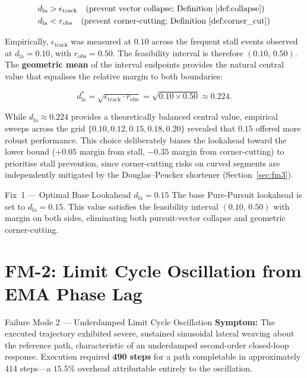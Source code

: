 \documentclass[12pt, a4paper, oneside]{report}
\theoremstyle{definition}
\newcommand{\dlookahead}{d_{\mathrm{la}}}
\begin{document}
\begin{align}
  \dlookahead &> \epsilon_{\mathrm{track}}
    \quad\text{(prevent vector collapse; Definition~\ref{def:collapse})}
    \label{eq:lower} \\
  \dlookahead &< r_{\mathrm{obs}}
    \quad\text{(prevent corner-cutting; Definition~\ref{def:corner_cut})}
    \label{eq:upper}
\end{align}

Empirically, $\epsilon_{\mathrm{track}}$ was measured at $0.10$
across the frequent stall events observed at $\dlookahead = 0.10$, with
$r_{\mathrm{obs}} = 0.50$. The feasibility interval is therefore
$(0.10,\, 0.50)$. The \textbf{geometric mean} of the interval
endpoints provides the natural central value that equalises the
relative margin to both boundaries:

\begin{equation}
  \dlookahead^* = \sqrt{\epsilon_{\mathrm{track}} \cdot r_{\mathrm{obs}}}
               = \sqrt{0.10 \times 0.50}
               \approx 0.224.
  \label{eq:opt_la}
\end{equation}

While $\dlookahead \approx 0.224$ provides a theoretically balanced central value, empirical sweeps across the grid $\{0.10, 0.12, 0.15, 0.18, 0.20\}$ revealed that $0.15$ offered more robust performance. This choice deliberately biases the lookahead toward the lower bound ($+0.05$ margin from stall, $-0.35$ margin from corner-cutting) to prioritise stall prevention, since corner-cutting risks on curved segments are independently mitigated by the Douglas--Peucker shortener (Section~\ref{sec:fm3}).

\begin{fixbox}{Fix~1 --- Optimal Base Lookahead
               $\dlookahead = 0.15$}
The base Pure-Pursuit lookahead is set to $\dlookahead = 0.15$.
This value satisfies the feasibility interval $(0.10,\,0.50)$ with
margin on both sides, eliminating both pursuit-vector collapse and
geometric corner-cutting.
\end{fixbox}

\section{FM-2: Limit Cycle Oscillation from EMA Phase Lag}
\label{sec:fm2}

\begin{fmbox}{Failure Mode 2 — Underdamped Limit Cycle
              Oscillation}
\textbf{Symptom:}
The executed trajectory exhibited severe, sustained sinusoidal
lateral weaving about the reference path, characteristic of an
underdamped second-order closed-loop response. Execution required
\textbf{490 steps} for a path completable in approximately 414
steps---a $15.5\%$ overhead attributable entirely to the
oscillation.
\end{fmbox}
\end{document}
